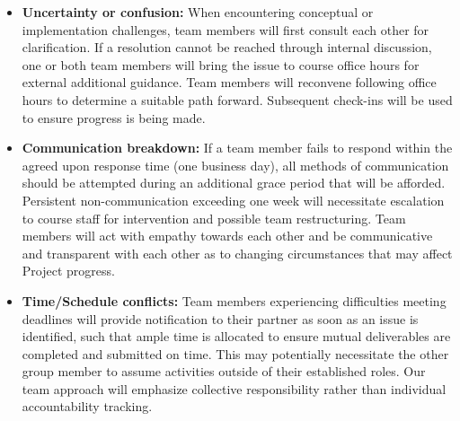 \documentclass{article}
\begin{document}
\begin{tcolorbox}[colback=secondarycolor, colframe=primarycolor, title=\textbf{Team Member Response Procedures:}]
\begin{itemize}
  \item \textbf{Uncertainty or confusion:} When encountering conceptual or implementation challenges, team members will first consult each other for clarification. If a resolution cannot be reached through internal discussion, one or both team members will bring the issue to course office hours for external additional guidance. Team members will reconvene following office hours to determine a suitable path forward. Subsequent check-ins will be used to ensure progress is being made.
 
 \vspace{0.2cm}

  \item \textbf{Communication breakdown:} If a team member fails to respond within the agreed upon response time (one business day), all methods of communication should be attempted during an additional grace period that will be afforded. Persistent non-communication exceeding one week will necessitate escalation to course staff for intervention and possible team restructuring. Team members will act with empathy towards each other and be communicative and transparent with each other as to changing circumstances that may affect Project progress.
  
  \vspace{0.2cm}
   
  \item \textbf{Time/Schedule conflicts:} Team members experiencing difficulties meeting deadlines will provide notification to their partner as soon as an issue is identified, such that ample time is allocated to ensure mutual deliverables are completed and submitted on time. This may potentially necessitate the other group member to assume activities outside of their established roles. Our team approach will emphasize collective responsibility rather than individual accountability tracking.
\end{itemize}
\end{tcolorbox}
\end{document}

